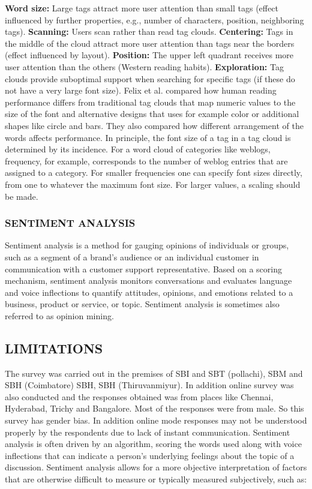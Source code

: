 \documentclass[a4paper, 12pt]{extarticle}
\begin{document}
{\textbf{Word size:} Large tags attract more user attention than small tags (effect influenced by further properties, e.g., number of characters, position, neighboring tags).
\textbf{Scanning:} Users scan rather than read tag clouds.
\textbf{Centering:} Tags in the middle of the cloud attract more user attention than tags near the borders (effect influenced by layout).
\textbf{Position:} The upper left quadrant receives more user attention than the others (Western reading habits).
\textbf{Exploration:} Tag clouds provide suboptimal support when searching for specific tags (if these do not have a very large font size).
Felix et al. compared how human reading performance differs from traditional tag clouds that map numeric values to the size of the font and alternative designs that uses for example color or additional shapes like circle and bars. They also compared how different arrangement of the words affects performance.
In principle, the font size of a tag in a tag cloud is determined by its incidence. For a word cloud of categories like weblogs, frequency, for example, corresponds to the number of weblog entries that are assigned to a category. For smaller frequencies one can specify font sizes directly, from one to whatever the maximum font size. For larger values, a scaling should be made.
\subsubsection{SENTIMENT ANALYSIS}
Sentiment analysis is a method for gauging opinions of individuals or groups, such as a segment of a brand’s audience or an individual customer in communication with a customer support representative. Based on a scoring mechanism, sentiment analysis monitors conversations and evaluates language and voice inflections to quantify attitudes, opinions, and emotions related to a business, product or service, or topic. Sentiment analysis is sometimes also referred to as opinion mining.

\subsection{LIMITATIONS}
The survey was carried out in the premises of SBI and SBT (pollachi), SBM and SBH (Coimbatore) SBH, SBH (Thiruvanmiyur). In addition online survey was also conducted and the responses obtained was from places like Chennai, Hyderabad, Trichy and Bangalore. Most of the responses were from male. So this survey has gender bias. In addition online mode responses may not be understood properly by the respondents due to lack of instant communication. 
Sentiment analysis is often driven by an algorithm, scoring the words used along with voice inflections that can indicate a person’s underlying feelings about the topic of a discussion. Sentiment analysis allows for a more objective interpretation of factors that are otherwise difficult to measure or typically measured subjectively, such as:

}
\end{document}
